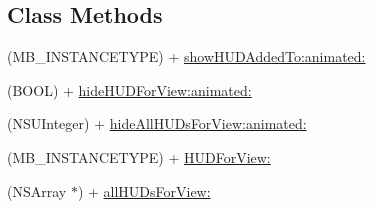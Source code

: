 \subsection*{Class Methods}
\begin{DoxyCompactItemize}
\item 
(M\+B\+\_\+\+I\+N\+S\+T\+A\+N\+C\+E\+T\+Y\+P\+E) + \hyperlink{interface_m_b_progress_h_u_d_a85d0c8c9647c47a289e7e7ea5d477c9a}{show\+H\+U\+D\+Added\+To\+:animated\+:}
\item 
(B\+O\+O\+L) + \hyperlink{interface_m_b_progress_h_u_d_ab7a06aebc0d49b4fc963815ad424013f}{hide\+H\+U\+D\+For\+View\+:animated\+:}
\item 
(N\+S\+U\+Integer) + \hyperlink{interface_m_b_progress_h_u_d_a86053d76e84d0fdf033af091df5ea239}{hide\+All\+H\+U\+Ds\+For\+View\+:animated\+:}
\item 
(M\+B\+\_\+\+I\+N\+S\+T\+A\+N\+C\+E\+T\+Y\+P\+E) + \hyperlink{interface_m_b_progress_h_u_d_a30afd912f412c6612eee7f1e17241b5b}{H\+U\+D\+For\+View\+:}
\item 
(N\+S\+Array $\ast$) + \hyperlink{interface_m_b_progress_h_u_d_aaa8882a53b5edfd617b4ba112c60811b}{all\+H\+U\+Ds\+For\+View\+:}
\end{DoxyCompactItemize}
